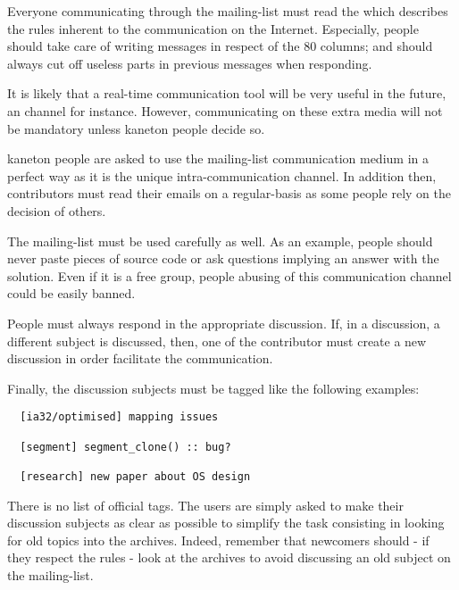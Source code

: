 Everyone communicating through the mailing-list must read the
 which describes the rules inherent to the communication
on the Internet. Especially, people should take care of writing messages in
respect of the $80$ columns; and should always cut off useless parts
in previous messages when responding.

It is likely that a real-time communication tool will be very useful in the
future, an  channel for instance. However, communicating on
these extra media will not be mandatory unless kaneton people decide so.

kaneton people are asked to use the mailing-list communication medium
in a perfect way as it is the unique intra-communication channel. In
addition then, contributors must read their emails on a regular-basis
as some people rely on the decision of others.

The  mailing-list must be used carefully as well. As
an example, people should never paste pieces of source code or ask
questions implying an answer with the solution. Even if it is a free
group, people abusing of this communication channel could be easily banned.

People must always respond in the appropriate discussion. If, in a discussion,
a different subject is discussed, then, one of the contributor must create
a new discussion in order facilitate the communication.

Finally, the discussion subjects must be tagged like the following examples:

\begin{verbatim}
  [ia32/optimised] mapping issues

  [segment] segment_clone() :: bug?

  [research] new paper about OS design
\end{verbatim}

There is no list of official tags. The users are simply asked to make
their discussion subjects as clear as possible to simplify the task
consisting in looking for old topics into the archives. Indeed, remember
that newcomers should - if they respect the rules - look at the archives
to avoid discussing an old subject on the mailing-list.
